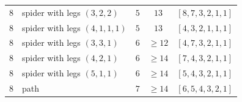 \begin{longtable}{@{} c >{\raggedright\arraybackslash}p{3.65in} c c c @{}}
$8$ & spider with legs $(3,2,2)$ & $5$ & $13$ & $[8,7,3,2,1,1]$ \\
$8$ & spider with legs $(4,1,1,1)$ & $5$ & $13$ & $[4,3,2,1,1,1]$ \\
$8$ & spider with legs $(3,3,1)$ & $6$ & $\ge 12$ & $[4,7,3,2,1,1]$ \\
$8$ & spider with legs $(4,2,1)$ & $6$ & $\ge 14$ & $[7,4,3,2,1,1]$ \\
$8$ & spider with legs $(5,1,1)$ & $6$ & $\ge 14$ & $[5,4,3,2,1,1]$ \\
$8$ & path & $7$ & $\ge 14$ & $[6,5,4,3,2,1]$ \\
\end{longtable}
\normalsize
